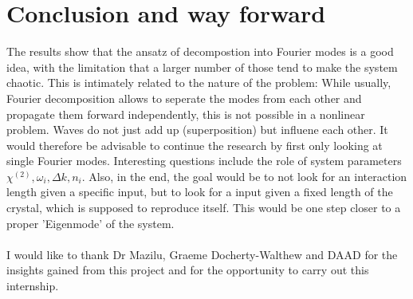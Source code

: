 \documentclass{article}
\begin{document}
\section{Conclusion and way forward}
The results show that the ansatz of decompostion into Fourier modes is a good idea, with the limitation that a larger number of those tend to make the system chaotic. This is intimately related to the nature of the problem: While usually, Fourier decomposition allows to seperate the modes from each other and propagate them forward independently, this is not possible in a nonlinear problem. Waves do not just add up (superposition) but influene each other. It would therefore be advisable to continue the research by first only looking at single Fourier modes. Interesting questions include the role of system parameters $\chi^{(2)}, \omega_i, \Delta k, n_i$. Also, in the end, the goal would be to not look for an interaction length given a specific input, but to look for a input given a fixed length of the crystal, which is supposed to reproduce itself. This would be one step closer to a proper 'Eigenmode' of the system.
\\
\\
I would like to thank Dr Mazilu, Graeme Docherty-Walthew and DAAD for the insights gained from this project and for the opportunity to carry out this internship.
\end{document}
